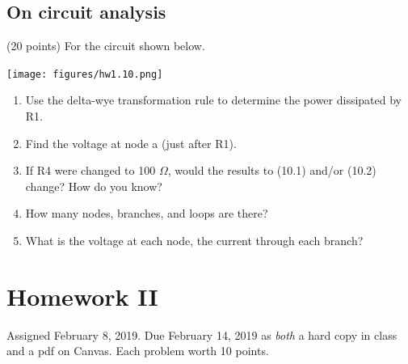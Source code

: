 \documentclass[11pt]{book}
\begin{document}
\section{On circuit analysis}
(20 points) For the circuit shown below.
\begin{center}
	\texttt{[image: figures/hw1.10.png]}
\end{center}

\begin{enumerate}
	\item Use the delta-wye transformation rule to determine the power dissipated by R1.
	\item Find the voltage at node a (just after R1). 
	\item If R4 were changed to 100 $\Omega$, would the results to (10.1) and/or (10.2) change? How do you know?
	\item How many nodes, branches, and loops are there?
	\item What is the voltage at each node, the current through each branch?
\end{enumerate}




\chapter*{Homework II}
Assigned February 8, 2019. Due February 14, 2019 as \textit{both} a hard copy in class and a pdf on Canvas. Each problem worth 10 points.
\setcounter{chapter}{2}
\setcounter{section}{0}
\end{document}

